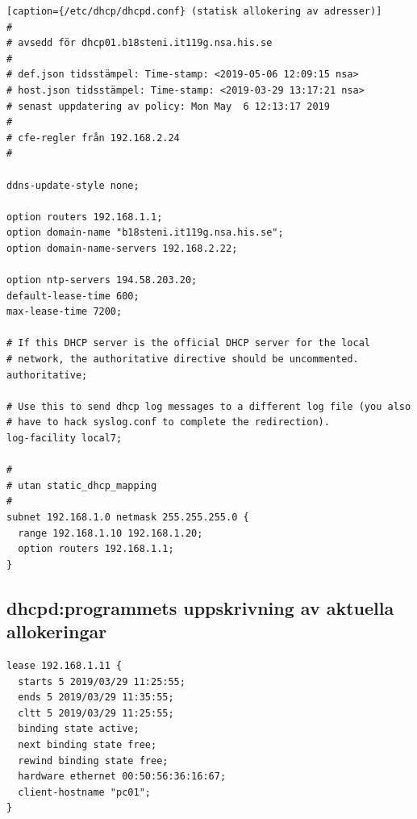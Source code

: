 \documentclass[swedish,10pt,a4paper]{report}
\begin{document}
\begin{lstlisting}[caption={/etc/dhcp/dhcpd.conf} (statisk allokering av adresser)]
#
# avsedd för dhcp01.b18steni.it119g.nsa.his.se
#
# def.json tidsstämpel: Time-stamp: <2019-05-06 12:09:15 nsa>
# host.json tidsstämpel: Time-stamp: <2019-03-29 13:17:21 nsa>
# senast uppdatering av policy: Mon May  6 12:13:17 2019
#
# cfe-regler från 192.168.2.24
#

ddns-update-style none;

option routers 192.168.1.1;
option domain-name "b18steni.it119g.nsa.his.se";
option domain-name-servers 192.168.2.22;

option ntp-servers 194.58.203.20;
default-lease-time 600;
max-lease-time 7200;

# If this DHCP server is the official DHCP server for the local
# network, the authoritative directive should be uncommented.
authoritative;

# Use this to send dhcp log messages to a different log file (you also
# have to hack syslog.conf to complete the redirection).
log-facility local7;

#
# utan static_dhcp_mapping
#
subnet 192.168.1.0 netmask 255.255.255.0 {
  range 192.168.1.10 192.168.1.20;
  option routers 192.168.1.1;
}
\end{lstlisting}

\subsection{dhcpd:programmets uppskrivning av aktuella allokeringar}\label{appendix:dhcp_leases}

\begin{lstlisting}[caption={/var/lib/dhcp/dhcpd.leases}]
lease 192.168.1.11 {
  starts 5 2019/03/29 11:25:55;
  ends 5 2019/03/29 11:35:55;
  cltt 5 2019/03/29 11:25:55;
  binding state active;
  next binding state free;
  rewind binding state free;
  hardware ethernet 00:50:56:36:16:67;
  client-hostname "pc01";
}
\end{lstlisting}


\newpage
\printbibliography{}
\end{document}
